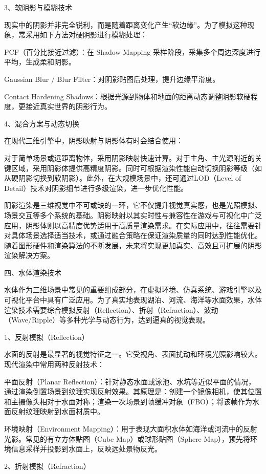 3、软阴影与模糊技术

现实中的阴影并非完全锐利，而是随着距离变化产生``软边缘''。为了模拟这种现象，常采用如下方法对硬阴影进行模糊处理：

PCF（百分比接近过滤）：在 Shadow Mapping 采样阶段，采集多个周边深度进行平均，生成柔和阴影。

Gaussian Blur / Blur Filter：对阴影贴图后处理，提升边缘平滑度。

Contact Hardening Shadows：根据光源到物体和地面的距离动态调整阴影软硬程度，更接近真实世界的阴影行为。

4、混合方案与动态切换

在现代三维引擎中，阴影映射与阴影体有时会结合使用：

对于简单场景或远距离物体，采用阴影映射快速计算。对于主角、主光源附近的关键区域，采用阴影体提供高精度阴影。同时可根据渲染性能自动切换阴影等级（如从硬阴影切换到软阴影）。此外，在大规模场景中，还可通过LOD（Level of Detail）技术对阴影细节进行多级渲染，进一步优化性能。

阴影渲染是三维视觉中不可或缺的一环，它不仅提升视觉真实感，也是光照模拟、场景交互等多个系统的基础。阴影映射以其实时性与兼容性在游戏与可视化中广泛应用，阴影体则以高精度优势适用于高质量渲染需求。在实际应用中，往往需要针对具体场景选择适当技术，或通过融合策略在保证渲染质量的同时达到性能优化。随着图形硬件和渲染算法的不断发展，未来将实现更加真实、高效且可扩展的阴影渲染解决方案。

四、水体渲染技术

水体作为三维场景中常见的重要组成部分，在虚拟环境、仿真系统、游戏引擎以及可视化平台中具有广泛应用。为了真实地表现湖泊、河流、海洋等水面效果，水体渲染技术需要综合模拟反射（Reflection）、折射（Refraction）、波动（Wave/Ripple）等多种光学与动态行为，达到逼真的视觉表现。

1、反射模拟（Reflection）

水面的反射是最显著的视觉特征之一。它受视角、表面扰动和环境光照影响较大。现代渲染中常用两种反射技术：

平面反射（Planar Reflection）：针对静态水面或泳池、水坑等近似平面的情况，通过渲染倒置场景到纹理实现反射效果。其原理是：创建一个镜像相机，使其位置和主摄像头相对于水面对称；渲染一次场景到帧缓冲对象（FBO）；将该帧作为水面反射纹理映射到水面材质中。

环境映射（Environment Mapping）：用于表现大面积水体如海洋或河流中的反射光影。常见的有立方体贴图（Cube Map）或球形贴图（Sphere Map），预先将环境信息采样并投影到水面上，反映远处景物反光。

2、折射模拟（Refraction）


